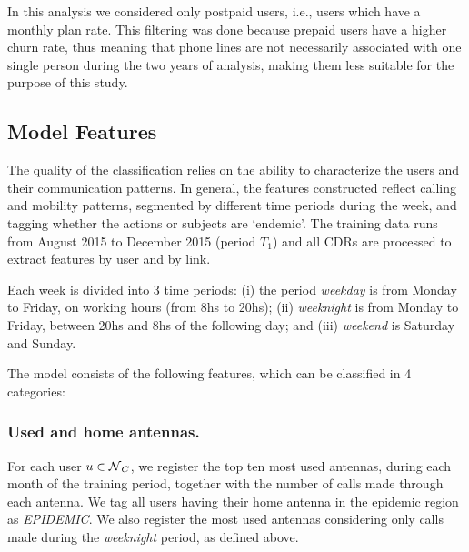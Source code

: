 In this analysis we considered only postpaid users, i.e., users which have a monthly  plan rate. This filtering was done because prepaid users have a higher churn rate, thus meaning that phone lines are not necessarily associated with one single person during the two years of analysis, making them less suitable for the purpose of this study.




\subsection{Model Features}

The quality of the classification relies on the ability to characterize the users and their communication patterns. %
In general, the features constructed reflect calling and mobility patterns,
segmented by different time periods during the week, and tagging whether the actions or subjects are `endemic'. 
The training data runs from August 2015 to December 2015 (period $T_1$) and all CDRs are processed to extract features by user and by link. 

Each week is divided into 3 time periods: (i) the period \textit{weekday} is from Monday to Friday, on working hours (from 8hs to 20hs); (ii) \textit{weeknight} is from Monday to Friday, between 20hs and 8hs of the following day;
and (iii) \textit{weekend} is Saturday and Sunday.

The model consists of the following features, which can be classified in 4 categories:


\subsubsection{Used and home antennas.}\label{homeantenna}

For each user $u \in \operatorname{\mathcal{N}}_C$, we register the top ten most used antennas, during each month of the training period,
together with the number of calls made through each antenna. We tag all users having their home antenna in the epidemic region as \textit{EPIDEMIC}. 
%
%
We also register the most used antennas considering only calls made during the \textit{weeknight} period, as defined above. %


